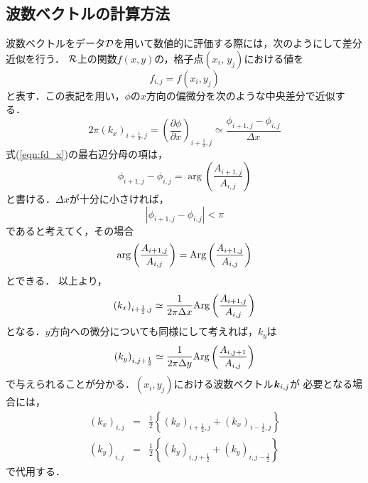 \subsection{波数ベクトルの計算方法}
波数ベクトルをデータ$\cal D$を用いて数値的に評価する際には，次のようにして差分近似を行う．
$\cal R$上の関数$f(x,y)$の，格子点$(x_i,\, y_j)$における値を
\begin{equation}
	f_{i,j}=f(x_i,y_j)
	\label{eqn:}
\end{equation}
と表す．この表記を用い，$\phi$の$x$方向の偏微分を次のような中央差分で近似する．
\begin{equation}
	2\pi (k_x)_{i+\frac{1}{2},j}
	=
	\left( \frac{\partial \phi }{\partial x}\right) _{i+\frac{1}{2},j}
	\simeq 
	\frac{\phi_{i+1,j}-\phi_{i,j}}{\Delta x}
	\label{eqn:fd_x}
\end{equation}
式(\ref{eqn:fd_x})の最右辺分母の項は，
\begin{equation}
	\phi_{i+1,j}-\phi_{i,j}
	=
	\arg \left(\frac{ A_{i+1,j}}{A_{i,j}}\right)
\end{equation}
と書ける．$\Delta x$が十分に小さければ，
\begin{equation}
	\left| \phi_{i+1,j}-\phi_{i,j}\right| < \pi
	\label{eqn:phi_bound}
\end{equation}
であると考えてく，その場合
\begin{equation}
	\arg \left(\frac{ A_{i+1,j}}{A_{i,j}}\right)
	=
	{\rm Arg}\left(\frac{ A_{i+1,j}}{A_{i,j}}\right)
\end{equation}
とできる．
以上より，
\begin{equation}
	\left( k_x \right)_{i+\frac{1}{2},j} 
	\simeq 
	\frac{1}{2\pi \Delta x}
	{\rm Arg} \left( \frac{ A_{i+1,j}}{A_{i,j}} \right)
	\label{eqn:kx_FD}
\end{equation}
となる．$y$方向への微分についても同様にして考えれば，$k_y$は
\begin{equation}
	\left( k_y \right)_{i,j+\frac{1}{2}} 
	\simeq 
	\frac{1}{2\pi \Delta y}
	{\rm Arg} \left( \frac{ A_{i,j+1}}{A_{i,j}} \right)
	\label{eqn:ky_FD}
\end{equation}
で与えられることが分かる．$(x_i,y_j)$における波数ベクトル$\mbox{\boldmath{$k$}}_{i,j}$が
必要となる場合には，
\begin{eqnarray}
	(k_x)_{i,j} &=&
	\frac{1}{2}\left\{ (k_x)_{i+\frac{1}{2},j}+ (k_x)_{i-\frac{1}{2},j} \right\}
	\label{eqn:} \\
	(k_y)_{i,j} &=&
	\frac{1}{2}\left\{ (k_y)_{i,j+\frac{1}{2}}+ (k_y)_{i,j-\frac{1}{2}} \right\}
	\label{eqn:}
\end{eqnarray}
で代用する．
